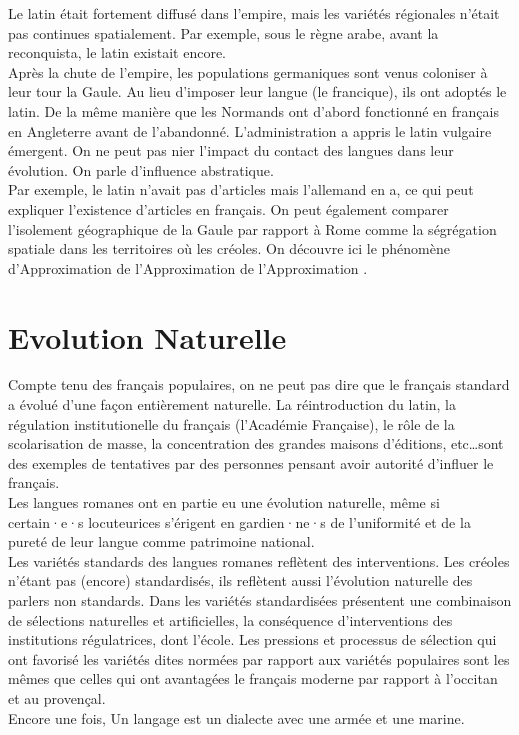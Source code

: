 \documentclass{cours}
\begin{document}
Le latin était fortement diffusé dans l'empire, mais les variétés régionales n'était pas continues spatialement. Par exemple, sous le règne arabe, avant la reconquista, le latin existait encore.\\
Après la chute de l'empire, les populations germaniques sont venus coloniser à leur tour la Gaule. Au lieu d'imposer leur langue (le francique), ils ont adoptés le latin. De la même manière que les Normands ont d'abord fonctionné en français en Angleterre avant de l'abandonné. 
L'administration a appris le latin vulgaire émergent. On ne peut pas nier l'impact du contact des langues dans leur évolution. On parle d'influence abstratique.\\
Par exemple, le latin n'avait pas d'articles mais l'allemand en a, ce qui peut expliquer l'existence d'articles en français. 
On peut également comparer l'isolement géographique de la Gaule par rapport à Rome comme la ségrégation spatiale dans les territoires où les créoles. 
On découvre ici le phénomène d'\og Approximation de l'Approximation de l'Approximation \fg.

\section{Evolution Naturelle}
Compte tenu des français populaires, on ne peut pas dire que le français standard a évolué d'une façon entièrement naturelle. 
La réintroduction du latin, la régulation institutionelle du français (l'Académie Française), le rôle de la scolarisation de masse, la concentration des grandes maisons d'éditions, etc\ldots sont des exemples de tentatives par des personnes pensant avoir autorité d'influer le français.\\
Les langues romanes ont en partie eu une évolution naturelle, même si certain·e·s locuteurices s'érigent en gardien·ne·s de l'uniformité et de la pureté de leur langue comme patrimoine national.\\
Les variétés standards des langues romanes reflètent des interventions. Les créoles n'étant pas (encore) standardisés, ils reflètent aussi l'évolution naturelle des parlers non standards. 
Dans les variétés standardisées présentent une combinaison de sélections naturelles et artificielles, la conséquence d'interventions des institutions régulatrices, dont l'école. 
Les pressions et processus de sélection qui ont favorisé les variétés dites normées par rapport aux variétés populaires sont les mêmes que celles qui ont avantagées le français moderne par rapport à l'occitan et au provençal.\\
Encore une fois, \og Un langage est un dialecte avec une armée et une marine\fg. 
\end{document}
